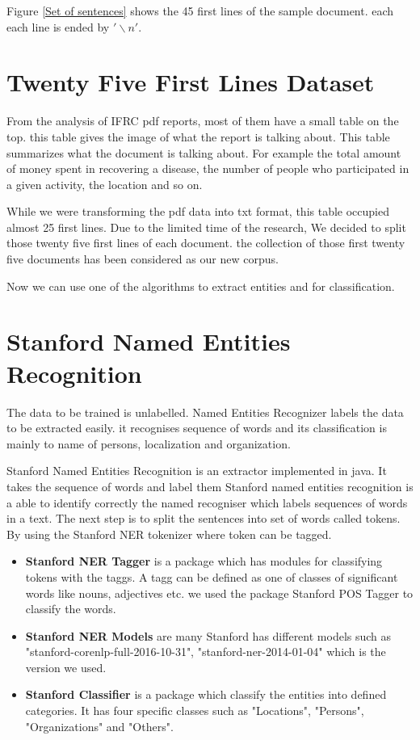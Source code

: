 Figure \ref{Set of sentences} shows the 45 first lines of the sample document. each each line is ended by  $'\backslash n'$. 

\section{Twenty Five First Lines Dataset \label{top}}

From the analysis of IFRC pdf reports, most of them have a small table on the top. this table gives the image of what the report is talking about. This table summarizes what the document is talking about. For example the total amount of money spent in recovering a disease, the number of people who participated in a given activity, the location and so on.

While we were transforming the pdf data into txt format, this table occupied almost 25 first lines. Due to the limited time of the research, We decided to split those twenty five first lines of each document. the collection of those first twenty five documents has been considered as our new corpus.

Now  we can use  one of the algorithms to extract entities and for classification.

\section{Stanford Named Entities Recognition}

The data to be trained is unlabelled. Named Entities Recognizer labels the data to be extracted easily. it recognises sequence of words and its classification is mainly to name of persons, localization and organization.

Stanford Named Entities Recognition is an extractor implemented in java. It takes the sequence of words and label them 
Stanford named entities recognition is  a able to identify correctly the named recogniser which labels sequences of words in a text. The next step is to split the sentences into set of words called tokens. By using the Stanford NER tokenizer  where token can be tagged. 

\begin{itemize} 
\item \textbf{Stanford NER Tagger} is a package which has modules for classifying tokens with the taggs. A tagg can be defined as one of classes of significant words like nouns, adjectives etc. we used the package Stanford POS Tagger to classify the words. 
\item \textbf{Stanford NER Models} are many Stanford has different models such as "stanford-corenlp-full-2016-10-31", "stanford-ner-2014-01-04" which is the version we used. 

\item \textbf{Stanford Classifier} is a package which classify the entities into defined categories. It has four specific classes such as  "Locations",  "Persons",  "Organizations" and    "Others".
\end{itemize}

